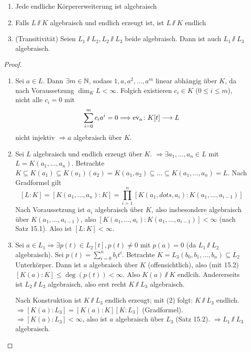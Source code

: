 \documentclass[12pt,a4paper]{scrartcl}
\begin{document}
\begin{satz}
	\leavevmode
	\begin{enumerate}
		\item Jede endliche Körpererweiterung ist algebraisch
		\item Falls $L\sslash K$ algebraisch und endlich erzeugt ist, ist $L\sslash K$ endlich
		\item (Transitivität) Seien $L_1\sslash L_2, L_2\sslash L_3$ beide algebraisch. Dann ist auch $L_1\sslash L_3$ algebraisch.
	\end{enumerate}
\end{satz}
\begin{proof}
	\leavevmode
	\begin{enumerate}
		\item Sei $a\in L$. Dann $\exists m\in \mathbb N$, sodass $1, a, a^2, \dots, a^m$ linear abhängig über $K$, da nach Voraussetzung $\dim_KL<\infty$. Folgich existieren $c_i\in K$ ($0\leq i \leq m$), nicht alle $c_i = 0$ mit
		$$\sum_{i=0}^mc_ia^i = 0 \Longrightarrow \operatorname{ev}_a\colon K[t]\longrightarrow L$$ nicht injektiv $\Rightarrow a$ algebraisch über $K$.
		\item Sei $L$ algebraisch und endlich erzeugt über $K$. $\Rightarrow \exists a_1,\dots, a_n\in L$ mit $L = K(a_1,\dots, a_n)$. Betrachte $K \subseteq K(a_1) \subseteq K(a_1)(a_2) = K(a_1,a_2)\subseteq \dots \subseteq K(a_1,\dots, a_n) = L$. Nach Gradformel gilt $$[L:K] = [K(a_1,\dots, a_n):K] = \prod_{i = 1}^{n}[K(a_1, dots, a_i):K(a_1,\dots, a_{i-1})]$$
		Nach Voraussetzung ist $a_i$ algebraisch über $K$, also insbesondere algebraisch über $K(a_1,\dots, a_{i-1})$, also $[K(a_1,\dots, a_i): K(a_1,\dots , a_{i-1})] < \infty$ (nach Satz 15.1). Also ist $[L:K]< \infty$.
		\item Sei $a\in L_1\Rightarrow \exists p(t)\in L_2[t], p(t)\neq 0$ mit $p(a) = 0$ (da $L_1\sslash L_2$ algebraisch). Sei $p(t) = \sum_{i =0}^nb_it^i$. Betrachte $K = L_3(b_0,b_1,\dots, b_n)\subseteq L_2$ Unterkörper. Dann ist $a$ algebraisch über $K$ (offensichtlich), also (mit 15.2) $[K(a):K] \leq \deg(p(t)) <\infty$. Also $K(a)\sslash K$ endlcih. Andererseits ist $L_2\sslash L_3$ algebraisch, also erst recht $K\sslash L_3$ algebraisch.
		
		Nach Konstruktion ist $K\sslash L_3$ endlich erzeugt; mit (2) folgt: $K\sslash L_3$ endlich. $\Rightarrow [K(a):L_3] = [K(a):K][K:L_3]$ (Gradformel). $\Rightarrow [K(a):L_3] <\infty$, also ist $a$ algebraisch über $L_3$ (Satz 15.2). $\Rightarrow L_1\sslash L_3$ algebraisch.
	\end{enumerate}
\end{proof}
\end{document}
